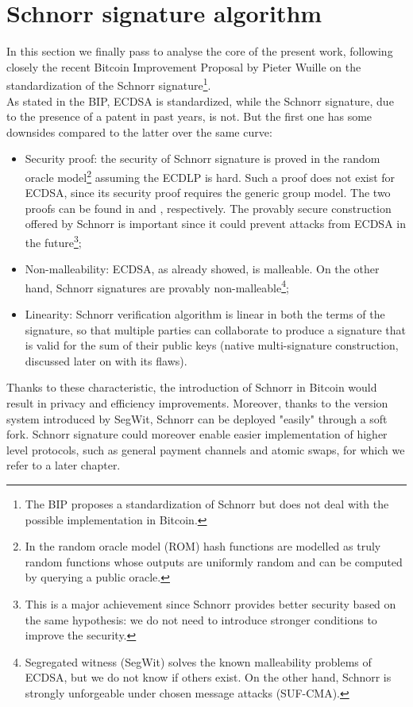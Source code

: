 \section{Schnorr signature algorithm}
In this section we finally pass to analyse the core of the present work, following closely the recent Bitcoin Improvement Proposal by Pieter Wuille \cite{RefWork:5} on the standardization of the Schnorr signature\footnote{The BIP proposes a standardization of Schnorr but does not deal with the possible implementation in Bitcoin.}.
\\
As stated in the BIP, ECDSA is standardized, while the Schnorr signature, due to the presence of a patent in past years, is not. But the first one has some downsides compared to the latter over the same curve:
\begin{itemize}
	\item Security proof: the security of Schnorr signature is proved in the random oracle model\footnote{In the random oracle model (ROM) hash functions are modelled as truly random functions whose outputs are uniformly random and can be computed by querying a public oracle.} assuming the ECDLP is hard. Such a proof does not exist for ECDSA, since its security proof requires the generic group model. The two proofs can be found in \cite{RefWork:8} and \cite{RefWork:9}, respectively. The provably secure construction offered by Schnorr is important since it could prevent attacks from ECDSA in the future\footnote{This is a major achievement since Schnorr provides better security based on the same hypothesis: we do not need to introduce stronger conditions to improve the security.};
	\item Non-malleability: ECDSA, as already showed, is malleable. On the other hand, Schnorr signatures are provably non-malleable\footnote{Segregated witness (SegWit) solves the known malleability problems of ECDSA, but we do not know if others exist. On the other hand, Schnorr is strongly unforgeable under chosen message attacks (SUF-CMA).};
	\item Linearity: Schnorr verification algorithm is linear in both the terms of the signature, so that multiple parties can collaborate to produce a signature that is valid for the sum of their public keys (native multi-signature construction, discussed later on with its flaws).
\end{itemize}
Thanks to these characteristic, the introduction of Schnorr in Bitcoin would result in privacy and efficiency improvements. Moreover, thanks to the version system introduced by SegWit, Schnorr can be deployed "easily" through a soft fork. Schnorr signature could moreover enable easier implementation of higher level protocols, such as general payment channels and atomic swaps, for which we refer to a later chapter.

